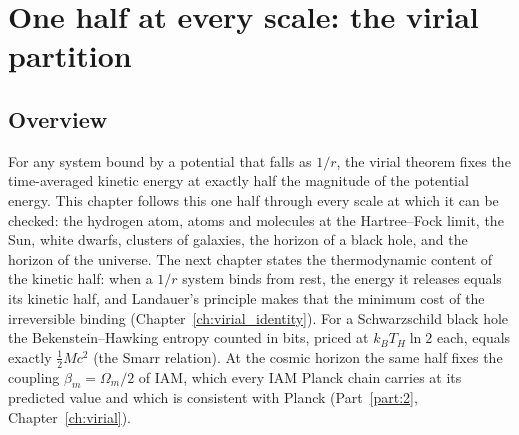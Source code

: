 
\chapter{One half at every scale: the virial partition}\label{ch:virial_law}

\section*{Overview}
For any system bound by a potential that falls as $1/r$, the virial theorem fixes the time-averaged kinetic energy at exactly half the magnitude of the
potential energy. This chapter follows this one half through every scale at which it can be checked: the hydrogen atom, atoms and molecules at the
Hartree--Fock limit, the Sun, white dwarfs, clusters of galaxies, the horizon of a black hole, and the horizon of the universe. The next chapter states
the thermodynamic content of the kinetic half: when a $1/r$ system binds from rest, the energy it releases equals its kinetic half, and Landauer's principle
makes that the minimum cost of the irreversible binding (Chapter~\ref{ch:virial_identity}). For a Schwarzschild black hole the Bekenstein--Hawking entropy
counted in bits, priced at $k_BT_H\ln2$ each, equals exactly $\tfrac12Mc^2$ (the Smarr relation). At the cosmic horizon the same half fixes the coupling
$\beta_m=\Omega_m/2$ of IAM, which every IAM Planck chain carries at its predicted value and which is consistent with Planck
(Part~\ref{part:2}, Chapter~\ref{ch:virial}).

